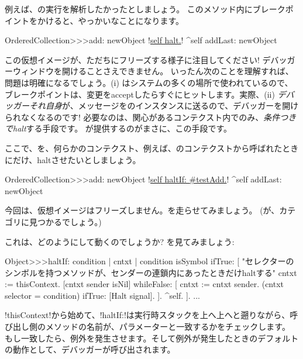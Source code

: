 \documentclass[a4paper,10pt,twoside]{book}
\begin{document}
例えば、の実行を解析したかったとしましょう。
このメソッド内にブレークポイントをかけると、やっかいなことになります。

\begin{code}{}
OrderedCollection>>>add: newObject
	!\underline{self halt.}!
	^self addLast: newObject
\end{code}

この仮想イメージが、ただちにフリーズする様子に注目してください! デバッガーウィンドウを開けることさえできません。
いったん次のことを理解すれば、問題は明確になるでしょう。(i) はシステムの多くの場所で使われているので、ブレークポイントは、変更をacceptしたらすぐにヒットします。実際、(ii) \emph{デバッガーそれ自身}が、メッセージをのインスタンスに送るので、デバッガーを開けられなくなるのです!
必要なのは、関心があるコンテクスト内でのみ、\emph{条件つきでhalt}する手段です。
が提供するのがまさに、この手段です。

ここで、を、何らかのコンテクスト、例えば、のコンテクストから呼ばれたときにだけ、haltさせたいとしましょう。

\begin{code}{}
OrderedCollection>>>add: newObject
	!\underline{self haltIf: \#testAdd.}!
	^self addLast: newObject
\end{code}

今回は、仮想イメージはフリーズしません。を走らせてみましょう。
(が、カテゴリに見つかるでしょう。)

これは、どのようにして動くのでしょうか? を見てみましょう:
\begin{code}{}
Object>>>haltIf: condition
	| cntxt |
	condition isSymbol ifTrue: [
		"セレクターのシンボルを持つメソッドが、センダーの連鎖内にあったときだけhaltする"
		cntxt := thisContext.
		[cntxt sender isNil] whileFalse: [
			cntxt := cntxt sender. 
			(cntxt selector = condition) ifTrue: [Halt signal]. ].
		^self.
	].
	...
\end{code}

\ct!thisContext!から始めて、\ct!haltIf:!は実行時スタックを上へ上へと遡りながら、呼び出し側のメソッドの名前が、パラメーターと一致するかをチェックします。
もし一致したら、例外を発生させます。そして例外が発生したときのデフォルトの動作として、デバッガーが呼び出されます。
\end{document}
